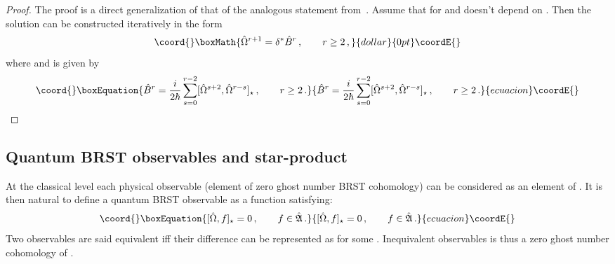 \documentclass[a4paper,11pt]{amsart}
\numberwithin{thm}{section} %
\numberwithin{equation}{section} %
\numberwithin{figure}{section} %
\providecommand{\qcommut}[2]{[#1,#2]_\star}
\renewcommand{\deg}[1]{{\rm deg}(#1)}
\renewcommand{\:}{{\rm\, :\,}}
\def\cP{{\mathcal P}}
\def\qA{{\hat{\mathfrak A}}}
\begin{document}
\begin{proof}
The proof is a direct generalization of that of the analogous
statement from~\cite{[GL]}. Assume that \myHighlight{${\hat\Omega}^r\in \qA_0$}\coordHE{} for \coordHE{}
and \myHighlight{${\hat\Omega}$}\coordHE{} doesn't depend on \myHighlight{$\cP$}\coordHE{}. Then the solution can be
constructed iteratively in the form
$$\coord{}\boxMath{
{\hat\Omega}^{r+1}=\delta^*{\hat B}^r\,,\qquad r\geq 2\,,
}{dollar}{0pt}\coordE{}$$
where \myHighlight{$\deg{{\hat\Omega}^{a}}=a$}\coordHE{} and \coordHE{} is given by
\begin{equation}\coord{}\boxEquation{
\label{eq:B-explicit-q}
{\hat B}^r=\frac{i}{2\hbar}\sum_{s=0}^{r-2}
\qcommut{{\hat\Omega}^{s+2}}{{\hat\Omega}^{r-s}}\,,\qquad r\geq 2\,.
}{
{\hat B}^r=\frac{i}{2\hbar}\sum_{s=0}^{r-2}
\qcommut{{\hat\Omega}^{s+2}}{{\hat\Omega}^{r-s}}\,,\qquad r\geq 2\,.
}{ecuacion}\coordE{}\end{equation}
\end{proof}

\subsection{Quantum BRST observables and star-product}
At the classical level each physical observable (element of zero ghost
number BRST cohomology) can be considered as an element of \myHighlight{$\qA$}\coordHE{}.
It is then natural to define a quantum BRST observable
as a function \coordHE{} satisfying:
\begin{equation}\coord{}\boxEquation{
\label{eq:extension-q}
  \qcommut{\hat\Omega}{f}=0\,, \qquad f\in \qA\,.
}{
\qcommut{\hat\Omega}{f}=0\,, \qquad f\in \qA\,.
}{ecuacion}\coordE{}\end{equation}
Two observables are said equivalent iff their difference
can be represented as \myHighlight{$\frac{i}{\hbar}\qcommut{\hat\Omega}{g}$}\coordHE{}
for some \myHighlight{$g\in \qA$}\coordHE{}. Inequivalent observables is thus
a zero ghost number cohomology of
\myHighlight{$\frac{i}{\hbar}\qcommut{\hat\Omega}{\cdot}$}\coordHE{}.
\end{document}
